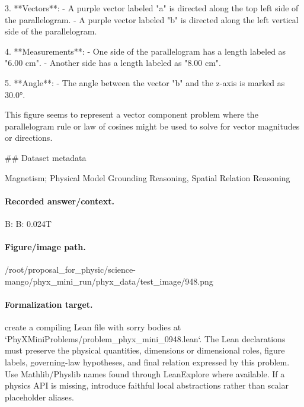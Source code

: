 3. **Vectors**:
   - A purple vector labeled "a" is directed along the top left side of the parallelogram.
   - A purple vector labeled "b" is directed along the left vertical side of the parallelogram.

4. **Measurements**:
   - One side of the parallelogram has a length labeled as "6.00 cm".
   - Another side has a length labeled as "8.00 cm".

5. **Angle**:
   - The angle between the vector "b" and the z-axis is marked as 30.0°.

This figure seems to represent a vector component problem where the parallelogram rule or law of cosines might be used to solve for vector magnitudes or directions.

\#\# Dataset metadata

Magnetism; Physical Model Grounding Reasoning, Spatial Relation Reasoning

\paragraph{Recorded answer/context.}
B: B: 0.024T

\paragraph{Figure/image path.}
/root/proposal\_for\_physic/science-mango/phyx\_mini\_run/phyx\_data/test\_image/948.png

\paragraph{Formalization target.}
create a compiling Lean file with sorry bodies at `PhyXMiniProblems/problem\_phyx\_mini\_0948.lean`. The Lean declarations must preserve the physical quantities, dimensions or dimensional roles, figure labels, governing-law hypotheses, and final relation expressed by this problem.
Use Mathlib/Physlib names found through LeanExplore where available. If a physics API is missing, introduce faithful local abstractions rather than scalar placeholder aliases.

